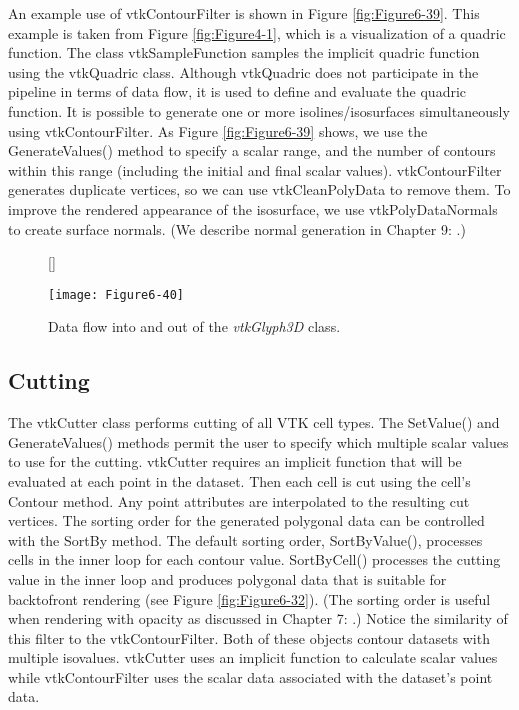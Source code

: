 An example use of vtkContourFilter is shown in Figure \ref{fig:Figure6-39}. This example is taken from Figure \ref{fig:Figure4-1}, which is a visualization of a quadric function. The class vtkSampleFunction samples the implicit quadric function using the vtkQuadric class. Although vtkQuadric does not participate in the pipeline in terms of data flow, it is used to define and evaluate the quadric function. It is possible to generate one or more isolines/isosurfaces simultaneously using vtkContourFilter. As Figure \ref{fig:Figure6-39} shows, we use the GenerateValues() method to specify a scalar range, and the number of contours within this range (including the initial and final scalar values). vtkContourFilter generates duplicate vertices, so we can use vtkCleanPolyData to remove them. To improve the rendered appearance of the isosurface, we use vtkPolyDataNormals to create surface normals. (We describe normal generation in Chapter 9: .)

\begin{figure}[!htb]
	[\FBwidth]
	{\caption{Data flow into and out of the \emph{vtkGlyph3D} class.}\label{fig:Figure6-40}}
	{\texttt{[image: Figure6-40]}}
\end{figure}


\subsection{Cutting}

The vtkCutter class performs cutting of all VTK cell types. The SetValue() and GenerateValues() methods permit the user to specify which multiple scalar values to use for the cutting. vtkCutter requires an implicit function that will be evaluated at each point in the dataset. Then each cell is cut using the cell's Contour method. Any point attributes are interpolated to the resulting cut vertices. The sorting order for the generated polygonal data can be controlled with the SortBy method. The default sorting order, SortByValue(), processes cells in the inner loop for each contour value. SortByCell() processes the cutting value in the inner loop and produces polygonal data that is suitable for backtofront rendering (see Figure \ref{fig:Figure6-32}). (The sorting order is useful when rendering with opacity as discussed in Chapter 7:  .) Notice the similarity of this filter to the vtkContourFilter. Both of these objects contour datasets with multiple isovalues. vtkCutter uses an implicit function to calculate scalar values while vtkContourFilter uses the scalar data associated with the dataset's point data.


